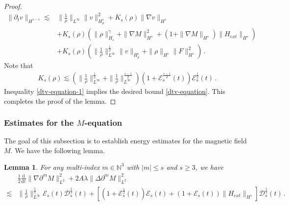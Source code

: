 \documentclass[reqno,11pt]{amsart}
\newtheorem{lemma}{Lemma}[section]
\numberwithin{equation}{section}
\def\p{\partial}
\def\d{\mathrm{d}}
\begin{document}
\begin{proof}
\begin{equation}\label{dtv-equation-1}
	\begin{aligned}
\|\partial_t v\|_{H^{s-1}}\lesssim & \|\frac{1}{\rho}\|_{L^\infty}\|v\|^2_{H^s_\rho}+K_s(\rho)\|\nabla v\|_{H^s} \\
& +K_s(\rho)(\|\rho\|^\gamma_{H_s}+\|\nabla M\|^2_{H^s}+(1+\|\nabla M\|_{H^s} ) \|H_{ext}\|_{H^s})\\
& + K_s(\rho) (\|\frac{1}{\rho}\|^{\frac{1}{2}}_{L^\infty} \|v\|_{H^s_\rho} + \|\rho\|_{H^s} \|F\|^2_{H^s} )  \,.
	\end{aligned}
\end{equation}
Note that 
\begin{equation*}
    \begin{aligned}
        K_s (\rho) \lesssim ( \| \frac{1}{\rho} \|_{L^\infty}^\frac{1}{2} + \| \frac{1}{\rho} \|_{L^\infty}^\frac{s-1}{2} ) ( 1 + \mathcal{E}_s^\frac{s-1}{2} (t) ) \mathcal{E}_s^\frac{1}{2} (t) \,.
    \end{aligned}
\end{equation*}
Inequality \eqref{dtv-equation-1} implies the desired bound \eqref{dtv-equation}. This completes the proof of the lemma.
\end{proof}

\subsubsection{\bf Estimates for the $M$-equation}

The goal of this subsection is to establish energy estimates for the magnetic field $M$. We have the following lemma.

\begin{lemma}\label{Lmm-M-loc}
    For any multi-index $m \in \mathbb{N}^3$ with $|m| \leq s$ and $s \geq 3$, we have
\begin{equation}\label{M-equation}
	\begin{aligned}
& \frac{1}{2}\frac{\d}{\d t}\|\nabla\p^m M\|^2_{L^2}+2A\lambda\|\Delta\p^m M\|^2_{L^2}\\
\lesssim & \|\frac{1}{\rho}\|^{\frac{1}{2}}_{L^\infty} \mathcal{E}_s (t) \mathcal{D}_s^\frac{1}{2} (t) + \left[ ( 1 + \mathcal{E}_s^\frac{1}{2} (t) ) \mathcal{E}_s (t) + ( 1 + \mathcal{E}_s (t) ) \|H_{ext}\|_{H^s} \right] \mathcal{D}_s^\frac{1}{2} (t) \,.
	\end{aligned}
\end{equation}
\end{lemma}
\end{document}
